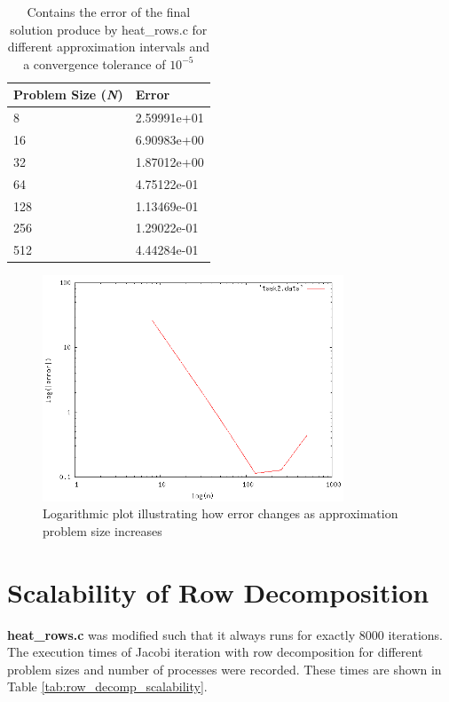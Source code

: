 \documentclass{article}
\begin{document}
\begin{table}
	\centering
	\begin{tabular}{|l|l|}
	\hline
	\textbf{Problem Size (\textit{N})} & \textbf{Error} \\
	\hline		
	8 & 2.59991e+01 \\
	16 & 6.90983e+00 \\
	32 & 1.87012e+00 \\
	64 & 4.75122e-01 \\
	128 & 1.13469e-01 \\
	256 & 1.29022e-01 \\
	512 & 4.44284e-01 \\
	\hline
	\end{tabular}
	\caption{Contains the error of the final solution produce by heat\_rows.c for different approximation intervals and a convergence tolerance of $10^{-5}$}
	\label{tab:larger_convergence_tolerance}
\end{table}

\begin{figure}
	\centering
	\includegraphics[width=0.8\textwidth]{task2/task2_plot.png}
	\caption{Logarithmic plot illustrating how error changes as approximation problem size increases}
	\label{fig:larger_convergence_tolerance}
\end{figure}

\section{Scalability of Row Decomposition}

\textbf{heat\_rows.c} was modified such that it always runs for exactly 8000 iterations. The execution times of Jacobi iteration with row decomposition for different problem sizes and number of processes were recorded. These times are shown in Table \ref{tab:row_decomp_scalability}.
\end{document}
